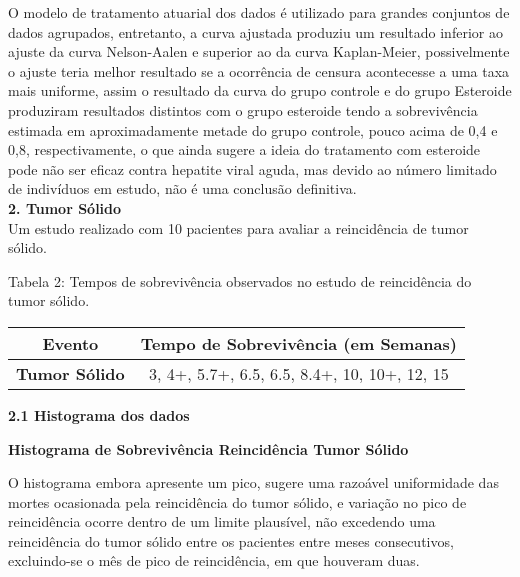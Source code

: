 \documentclass[12pt,a4paper]{article}
\begin{document}
	O modelo de tratamento atuarial dos dados é utilizado para grandes conjuntos de dados agrupados, entretanto, a curva ajustada produziu   um resultado inferior ao ajuste da curva Nelson-Aalen e superior ao da curva Kaplan-Meier, possivelmente o ajuste teria melhor resultado se a ocorrência de censura acontecesse a uma taxa mais uniforme, assim o resultado da curva do grupo controle e do grupo Esteroide produziram resultados distintos com o grupo esteroide tendo a sobrevivência estimada em aproximadamente metade do grupo controle, pouco acima de 0,4 e 0,8, respectivamente, o que ainda sugere a ideia do tratamento com esteroide pode não ser eficaz contra hepatite viral aguda, mas devido ao número limitado de indivíduos em estudo, não é uma conclusão definitiva.
	\vspace{1cm}\\
	\textbf{2. Tumor Sólido}
	\vspace{1cm}\\
	Um estudo realizado com 10 pacientes para avaliar a reincidência de tumor sólido.
	\begin{center}
		\small{Tabela 2: Tempos de sobrevivência observados no estudo de reincidência do tumor sólido.}\\
		\begin{tabular}{|c|c|}\hline
			\textbf{Evento} & \textbf{Tempo de Sobrevivência (em Semanas)}\\ \hline
			\textbf{Tumor Sólido}& 3, 4+, 5.7+, 6.5, 6.5, 8.4+, 10, 10+, 12, 15\\ \hline
		\end{tabular}
	\end{center}
	\vspace{1cm}
	\textbf{2.1 Histograma dos dados}
	\begin{center}
		\vspace{1cm}
		\textbf{Histograma de Sobrevivência Reincidência Tumor Sólido}
	\end{center}
	\vspace{1cm}
	O histograma embora apresente um pico, sugere uma razoável uniformidade das mortes ocasionada pela reincidência do tumor sólido, e variação no pico de reincidência ocorre dentro de um limite plausível, não excedendo uma reincidência do tumor sólido entre os pacientes entre meses consecutivos, excluindo-se o mês de pico de reincidência, em que houveram duas. 
\end{document}

